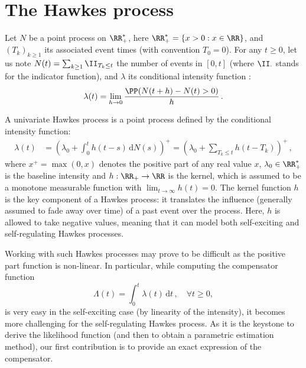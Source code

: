 \section{The Hawkes process}\label{sec:chap2_general}

Let $N$ be a point process on $\RR_+^*$, here \(\RR_+^* = \left\{ x>0 : x \in \RR \right\}\), and $(T_k)_{k\geq 1}$ its associated event times (with convention $T_0 = 0$).
For any $t \geq 0$, let us note $N(t) = \sum_{k\geq 1}{\II_{T_k \leq t }}$ the number of events in $[0,t]$
(where \(\II_{\cdot}\) stands for the indicator function),
and $\lambda$ its conditional intensity function \parencite{DaleyV1}:
\begin{equation*}
    \lambda(t) = \lim_{h\to 0}{\frac{\PP(N(t+h) - N(t) > 0)}{h}}\,.
\end{equation*}

A univariate Hawkes process is a point process defined by the conditional intensity function:
\begin{align}
    \lambda(t) &= \left(\lambda_0 + \int_{0}^{t}{h(t-s)\,\mathrm{d}N(s)}\right)^+
    = \left(\lambda_0 + \sum_{T_k \leq t}{h(t-T_k)}\right)^+\,,
    \label{eq:chap2_general_hawkes}
\end{align}
where $x^+ = \max(0,x)$ denotes the positive part of any real value $x$,
$\lambda_0\in\RR_+^*$ is the baseline intensity and
\(h : \RR_+ \to \RR\) is the kernel, which is assumed to be a monotone measurable function with $\lim_{t\to\infty} h(t) = 0$.
The kernel function $h$ is the key component of a Hawkes process:
it translates the influence (generally assumed to fade away over time) of a past event over the process.
Here, $h$ is allowed to take negative values, meaning that it can model both self-exciting and self-regulating Hawkes processes.

Working with such Hawkes processes may prove to be difficult as the positive part function is non-linear.
In particular, while computing the compensator function \parencite{DaleyV1}
\begin{equation}
    \Lambda(t) = \int_{0}^{t}{\lambda(t)\,\mathrm{d}t}\,,
    \quad \forall t \geq 0,
    \label{eq:chap2_compensator}
\end{equation}
is very easy in the self-exciting case (by linearity of the intensity), it becomes more challenging for the self-regulating Hawkes process.
As it is the keystone to derive the likelihood function (and then to obtain a parametric estimation method), our first contribution is to provide an exact expression of the compensator.

